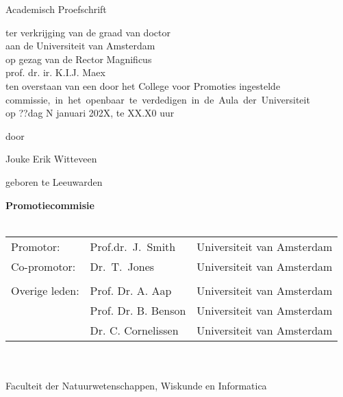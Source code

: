 {%
\clearpage
\par\vskip 2cm
\begin{center}
\printtitle
\par\vspace {6cm}
{\large \sc Academisch Proefschrift}
\par\vspace {1cm}
{\large ter verkrijging van de graad van doctor\\
aan de Universiteit van Amsterdam\\
op gezag van de Rector Magnificus\\
prof. dr. ir. K.I.J. Maex\\                                 %
ten overstaan van een door het College voor Promoties ingestelde\\
\mbox{commissie, in het openbaar te verdedigen in de Aula der Universiteit}\\     %
op ??dag N januari 202X, te XX.X0 uur \\ }        %
\par\vspace {1cm} {\large door}
\par \vspace {1cm}
{\Large Jouke Erik Witteveen} %
\par\vspace {1cm}
{\large geboren te Leeuwarden}
\end{center}

\clearpage
\noindent%
{\bf Promotiecommisie}\\
\\
\begin{tabular}[t]{@{}llr}
Promotor:      & Prof.dr.\ J.~Smith  & Universiteit van Amsterdam \\  %
Co-promotor:   & Dr.\ T.~Jones       & Universiteit van Amsterdam \\  %
\\
Overige leden: & Prof. Dr. A. Aap    & Universiteit van Amsterdam \\  %
               & Prof. Dr. B. Benson & Universiteit van Amsterdam \\  %
               & Dr. C. Cornelissen  & Universiteit van Amsterdam \\  %
\end{tabular}\\
\\
Faculteit der Natuurwetenschappen, Wiskunde en Informatica \\
\clearpage
} %

